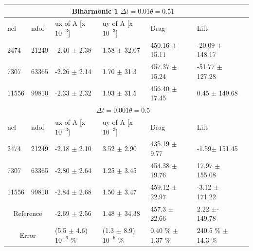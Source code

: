 \begin{table}[h!]
\centering
\label{my-label}
\begin{tabular}{ |p{1cm}||p{1cm}|p{3.2cm}|p{3.2cm}|p{2.9cm}|p{3.1cm}|p{1.2cm}|}
 \hline
  \multicolumn{6}{|c|}{Biharmonic 1 \hspace{2mm}  $\Delta t = 0.01 \theta = 0.51$} \\
   \hline
nel & ndof & ux of A [x $10^{-3}$]  &uy of A [x $10^{-3}$]& Drag  & Lift \\
 \hline
 2474     &21249  & -2.40 $\pm$ 2.38  & 1.58 $\pm$ 32.07  & 450.16  $\pm$ 15.11  & -20.09 $\pm$ 148.17 \\
 7307    & 63365  &  -2.26 $\pm$ 2.14  & 1.70  $\pm$ 31.3 & 457.37  $\pm$ 15.24 & -51.77 $\pm$ 127.28 \\
 11556   & 99810  &   -2.33 $\pm$ 2.32 &  1.93   $\pm$ 31.5  & 456.40 $\pm$ 17.45 &  0.45 $\pm$ 149.68  \\
 \hline
  \multicolumn{6}{|c|}{$\Delta t = 0.001 \theta = 0.5$} \\
   \hline
 nel & ndof & ux of A [x $10^{-3}$]  &uy of A [x $10^{-3}$]& Drag  & Lift \\
 2474    & 21249  & -2.18 $\pm$ 2.10& 3.52 $\pm$ 2.90 & 435.19   $\pm$   9.77  & -1.59$\pm$   151.45 \\
 7307    & 63365  & -2.80 $\pm$ 2.64 & 1.25 $\pm$ 3.45 & 454.38   $\pm$   19.76 & 17.97  $\pm$  155.08 \\
 11556   & 99810  & -2.84 $\pm$ 2.68  & 1.50 $\pm$ 3.47 & 459.12    $\pm$   22.97 & -3.12     $\pm$ 171.22 \\
 \hline
 \multicolumn{2}{|c|}{Reference} & -2.69 $\pm$  2.56                    & 1.48  $\pm$  34.38                   & 457.3  $\pm$  22.66        & 2.22  $\pm$- 149.78           \\
 \hline
 \multicolumn{2}{|c|}{Error}  & (5.5 $\pm$ 4.6)$10^{-6}$ \% & (1.3 $\pm$ 8.9)$10^{-6}$ \%  & 0.40 \% $\pm$ 1.37 \% & 240.5 \% $\pm$ 14.3 \%\\
 \hline
\end{tabular}
\end{table}

